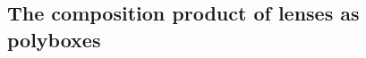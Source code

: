 \documentclass[Book-Poly]{subfiles}
\begin{document}




\subsection{The composition product of lenses as polyboxes}
\end{document}
